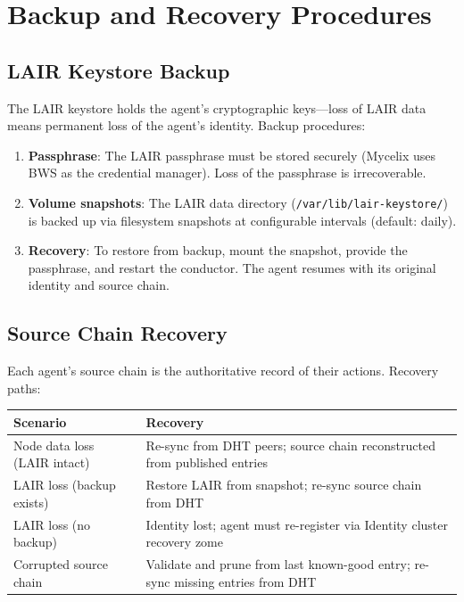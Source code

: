 \documentclass[12pt]{book}
\begin{document}
\section{Backup and Recovery Procedures}

\subsection{LAIR Keystore Backup}

The LAIR keystore holds the agent's cryptographic keys---loss of
LAIR data means permanent loss of the agent's identity.  Backup
procedures:

\begin{enumerate}
  \item \textbf{Passphrase}: The LAIR passphrase must be stored
    securely (Mycelix uses BWS as the credential manager).
    Loss of the passphrase is irrecoverable.
  \item \textbf{Volume snapshots}: The LAIR data directory
    (\texttt{/var/lib/lair-keystore/}) is backed up via filesystem
    snapshots at configurable intervals (default: daily).
  \item \textbf{Recovery}: To restore from backup, mount the snapshot,
    provide the passphrase, and restart the conductor.  The agent
    resumes with its original identity and source chain.
\end{enumerate}

\subsection{Source Chain Recovery}

Each agent's source chain is the authoritative record of their
actions.  Recovery paths:

\begin{longtable}{lp{8cm}}
\toprule
\textbf{Scenario} & \textbf{Recovery} \\
\midrule
\endhead
Node data loss (LAIR intact)   & Re-sync from DHT peers; source chain
  reconstructed from published entries \\
LAIR loss (backup exists)      & Restore LAIR from snapshot; re-sync
  source chain from DHT \\
LAIR loss (no backup)          & Identity lost; agent must re-register
  via Identity cluster recovery zome \\
Corrupted source chain         & Validate and prune from last known-good
  entry; re-sync missing entries from DHT \\
\bottomrule
\end{longtable}
\end{document}
